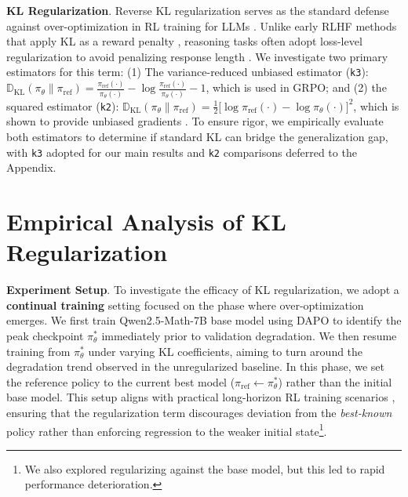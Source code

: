 \noindent\textbf{KL Regularization}. 
Reverse KL regularization serves as the standard defense against over-optimization in RL training for LLMs \citep{klcomedy}.
Unlike early RLHF methods that apply KL as a reward penalty \citep{ouyang2022training}, reasoning tasks often adopt loss-level regularization to avoid penalizing response length \citep{GRPO}. 
We investigate two primary estimators for this term:
(1) The variance-reduced unbiased estimator (\texttt{k3}):
$\mathbb D_\mathrm{KL}(\pi_\theta\|\pi_\mathrm{ref}) = \frac{\pi_\text{ref}(\cdot)}{\pi_\theta(\cdot)}-\log\frac{\pi_\text{ref}(\cdot)}{\pi_\theta(\cdot)}-1$, which is used in GRPO;
and (2) the squared estimator (\texttt{k2}):
$\mathbb D_\mathrm{KL}(\pi_\theta\|\pi_\mathrm{ref}) = \frac12[\log{\pi_\text{ref}(\cdot)}-\log{\pi_\theta(\cdot)]^2}$, which is shown to provide unbiased gradients \citep{klpitfalls}. 
To ensure rigor, we empirically evaluate both estimators to determine if standard KL can bridge the generalization gap, with \texttt{k3} adopted for our main results and \texttt{k2} comparisons deferred to the Appendix.





\section{Empirical Analysis of KL Regularization}\label{sec:kl}

\textbf{Experiment Setup}.
To investigate the efficacy of KL regularization, we adopt a \textbf{continual training} setting focused on the phase where over-optimization emerges.
We first train Qwen2.5-Math-7B base model \citep{Qwen25Math} using DAPO to identify the peak checkpoint $\pi_\theta^*$ immediately prior to validation degradation.
We then resume training from $\pi_\theta^*$ under varying KL coefficients, aiming to turn around the degradation trend observed in the unregularized baseline.
In this phase, we set the reference policy to the current best model ($\pi_\text{ref} \leftarrow \pi_\theta^*$) rather than the initial base model.
This setup aligns with practical long-horizon RL training scenarios \citep{Deepseek-R1}, ensuring that the regularization term discourages deviation from the \textit{best-known} policy rather than enforcing regression to the weaker initial state\footnote{We also explored regularizing against the base model, but this led to rapid performance deterioration.}.

